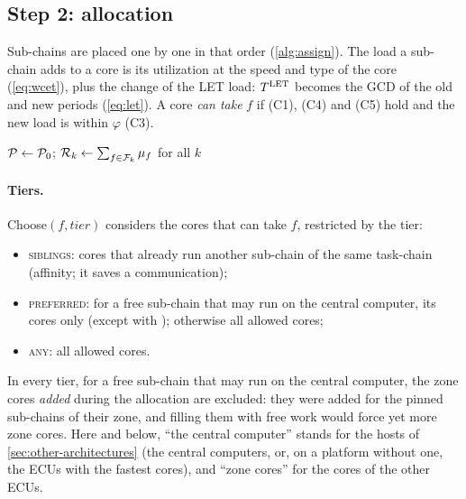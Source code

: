 \subsection{Step 2: allocation}
\label{sec:assignment}

Sub-chains are placed one by one in that order (\cref{alg:assign}). The
load a sub-chain adds to a core is its utilization at the speed and type of
the core (\cref{eq:wcet}), plus the change of the LET load: $T^{\mathrm{LET}}$
becomes the GCD of the old and new periods (\cref{eq:let}). A core
\emph{can take} $f$ if (C1), (C4) and (C5) hold and the new load is within
$\varphi$ (C3).

\begin{algorithm2e}[t]
\caption{\textsf{Allocate}$(\Frags)$}
\label{alg:assign}
$\mathcal{P}\gets\mathcal{P}_0$; $\mathcal{R}_k\gets\sum_{f\in\mathcal{F}_k}\mu_f$ for all $k$ 
\end{algorithm2e}

\paragraph{Tiers.} \textsf{Choose}$(f,\textit{tier})$ considers the cores
that can take $f$, restricted by the tier:
\begin{itemize}
\item \textsc{siblings}: cores that already run another sub-chain of the
same task-chain (affinity; it saves a communication);
\item \textsc{preferred}: for a free sub-chain that may run on the central
computer, its cores only (except with \CADU); otherwise all allowed cores;
\item \textsc{any}: all allowed cores.
\end{itemize}
In every tier, for a free sub-chain that may run on the central computer,
the zone cores \emph{added} during the allocation are excluded: they were
added for the pinned sub-chains of their zone, and filling them with free
work would force yet more zone cores. Here and below, ``the central
computer'' stands for the hosts of \cref{sec:other-architectures} (the
central computers, or, on a platform without one, the ECUs with the
fastest cores), and ``zone cores'' for the cores of the other ECUs.

